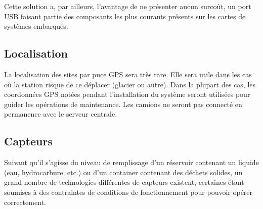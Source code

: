Cette solution a, par ailleurs, l’avantage de ne présenter aucun surcoût, un port USB faisant partie des composants les plus courants présents sur les cartes de systèmes embarqués.

\subsection{Localisation}

La localisation des sites par puce GPS sera très rare. Elle sera utile dans les cas où la station risque de ce déplacer (glacier ou autre). Dans la plupart des cas, les coordonnées GPS notées pendant l’installation du système seront utilisées pour guider les opérations de maintenance.
Les camions ne seront pas connecté en permanence avec le serveur centrale.


	 	



 

\subsection{Capteurs}

Suivant qu’il s’agisse du niveau de remplissage d’un réservoir contenant un liquide (eau, hydrocarbure, etc.) ou d’un container contenant des déchets solides, un grand nombre de technologies différentes de capteurs existent, certaines étant soumises à des contraintes de conditions de fonctionnement pour pouvoir opérer correctement.


